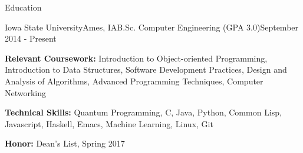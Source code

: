 \documentclass{resume} %
\begin{document}

\begin{rSection}{Education}

\begin{rSubsection}{Iowa State University}{Ames, IA}{B.Sc. Computer Engineering (GPA 3.0)}{September 2014 - Present}


\item{\textbf{Relevant Coursework:} Introduction to Object-oriented Programming, Introduction to Data Structures, Software Development Practices, Design and Analysis of Algorithms, Advanced Programming Techniques, Computer Networking}
\item{\textbf{Technical Skills:} Quantum Programming, C, Java, Python, Common Lisp, Javascript, Haskell, Emacs, Machine Learning, Linux, Git}
\item{\textbf{Honor:} Dean's List, Spring 2017 }



\end{rSubsection}
\end{rSection}

\end{document}

